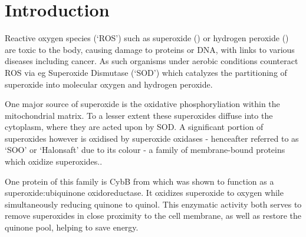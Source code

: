 \part{Introduction}

Reactive oxygen species (`ROS') such as superoxide () or hydrogen
peroxide () are toxic to the body, causing damage to proteins or DNA,
with links to various diseases including cancer. As such organisms under
aerobic conditions counteract ROS via eg Superoxide Dismutase (`SOD') which
catalyzes the partitioning of superoxide into molecular oxygen and hydrogen
peroxide.

One major source of superoxide is the oxidative phosphoryliation within the
mitochondrial matrix. \cite{Novo2008} To a lesser extent these superoxides
diffuse into the cytoplasm, where they are acted upon by SOD. A significant
portion of superoxides however is oxidised by superoxide oxidases - henceafter
referred to as `SOO' or `Halonsaft' due to its colour - a family of
membrane-bound proteins which oxidize superoxides.\cite{superoxide_salvaging}.

One protein of this family is CybB from \ecoli{} which was shown to function as
a superoxide:ubiquinone oxidoreductase. It oxidizes superoxide to oxygen while
simultaneously reducing quinone to quinol.\cite{superoxide_salvaging} This
enzymatic activity both serves to remove superoxides in close proximity to the
cell membrane, as well as restore the quinone pool, helping to save energy.

